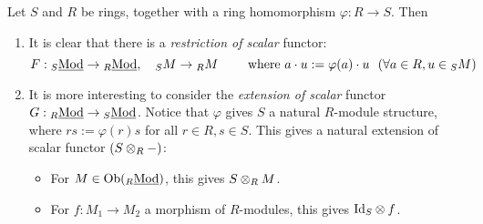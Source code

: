 Let $S$ and $R$ be rings, together with a ring homomorphism $\varphi: R \to S$. Then 
\begin{enumerate}
    \item It is clear that there is a \emph{restriction of scalar} functor:
    \[
        F: \catlmod{S} \to \catlmod{R}, \quad _SM \to {_RM} \qquad \text{ where } a\cdot u := \varphi(a)\cdot u\ \ (\forall a\in R, u\in {_SM})
    \]
    \item It is more interesting to consider the \emph{extension of scalar} functor $G: {}_{R}\underline{\textup{Mod}} \to {}_{S}\underline{\textup{Mod}}$. Notice that $\varphi$ gives $S$ a natural $R$-module structure, where $rs := \varphi(r)s$ for all $r \in R, s\in S$. This gives a natural extension of scalar functor $(S \otimes_R -)$:
    \begin{itemize}
        \item For $M \in \mathrm{Ob}({}_{R}\underline{\textup{Mod}})$, this gives $S \otimes_R M$.
        \item For $f: M_1 \to M_2$ a morphism of $R$-modules, this gives $\mathrm{Id}_S \otimes f$.
    \end{itemize}
\end{enumerate}

